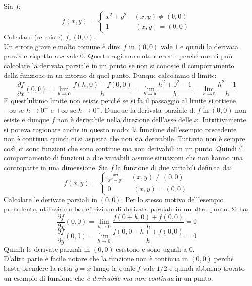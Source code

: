 \documentclass[a4paper]{article}
\numberwithin{equation}{subsection}
\begin{document}
\ex{}
{
    Sia $f$: 
    \[f(x,y) = \begin{cases}
        x^2 + y^2 \; \; \; \; (x,y) \neq (0,0)\\
        1 \; \; \; \; \; \; \;  \; \; \; \; \; \;  \; (x,y) = (0,0)
    \end{cases}\]
    Calcolare (se esiste) $f_x(0,0)$.\\
    Un errore grave e molto comune è dire: $f$ in $(0,0)$ vale $1$ e quindi la derivata parziale rispetto a $x$ vale $0$.
    Questo ragionamento è errato perché non si può calcolare la derivata parziale in un punto se non si conosce il comportamento della funzione in un intorno di quel punto.
    Dunque calcoliamo il limite:
    \[\frac{\partial f}{\partial x}(0,0) = \lim_{h \rightarrow 0} \frac{f(h,0) - f(0,0)}{h} = \lim_{h \rightarrow 0} \frac{h^2 + 0^2 - 1}{h} = \lim_{h \rightarrow 0} \frac{h^2 - 1}{h}\]
    E quest'ultimo limite non esiste perché se si fa il passaggio al limite si ottiene $-\infty$ se $h \rightarrow 0^+$ e $+\infty$ se $h \rightarrow 0^-$. Dunque 
    la derivata parziale di $f$ in $(0,0)$ non esiste e dunque $f$ non è derivabile nella direzione dell'asse delle $x$.
}
\noindent
Intuitivamente si poteva ragionare anche in questo modo: la funzione dell'esempio precedente non è continua quindi ci si aspetta che non sia derivabile.
Tuttavia non è sempre così, ci sono funzioni che sono continue ma non derivabili in un punto. Quindi il comportamento di funzioni a due variabili assume situazioni che non hanno una controparte in una dimensione.
\ex{}
{
    Sia $f$ la funzione di due variabili definita da: 
    \[f(x,y) = \begin{cases}
        \frac{xy}{x^2 + y^2} \; \; \; \; (x,y) \neq (0,0)\\
        0 \; \; \; \; \; \; \;  \; \; \; \; \; (x,y) = (0,0)
    \end{cases}\]
    Calcolare le derivate parziali in $(0,0)$. Per lo stesso motivo dell'esempio precedente, utilizziamo la definizione di derivata parziale in un altro punto. Si ha:
    \[\frac{\partial f}{\partial x} (0,0) = \lim_{h \rightarrow 0} \frac{f(0 + h, 0) + f(0,0)}{h} = 0\]
    \[\frac{\partial f}{\partial y} (0,0) = \lim_{h \rightarrow 0} \frac{f(0, 0 + h) + f(0,0)}{h} = 0\]
    Quindi le derivate parziali in $(0,0)$ esistono e sono uguali a $0$.\\
    D'altra parte è facile notare che la funzione non è continua in $(0,0)$ perché basta prendere la retta $y = x$ lungo la quale $f$ vale $1/2$ e quindi abbiamo trovato un esempio di funzione
    che \textit{è derivabile ma non continua} in un punto.
}
\end{document}
